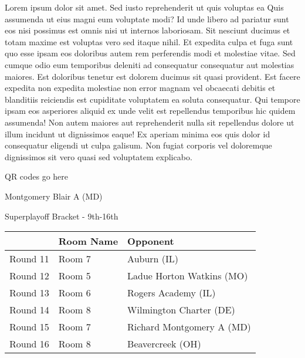 \documentclass{article}%
\begin{document}
\vspace*{8pt}%
\linebreak%
\newline%
\newline%
    Lorem ipsum dolor sit amet. Sed iusto reprehenderit ut quis voluptas ea Quis assumenda ut eius magni eum voluptate modi? Id unde libero ad pariatur sunt eos nisi possimus est omnis nisi ut internos laboriosam. Sit nesciunt ducimus et totam maxime est voluptas vero sed itaque nihil. Et expedita culpa et fuga sunt quo esse ipsam eos doloribus autem rem perferendis modi et molestiae vitae.\newline%
\newline%
    Sed cumque odio eum temporibus deleniti ad consequatur consequatur aut molestias maiores. Est doloribus tenetur est dolorem ducimus sit quasi provident. Est facere expedita non expedita molestiae non error magnam vel obcaecati debitis et blanditiis reiciendis est cupiditate voluptatem ea soluta consequatur. Qui tempore ipsam eos asperiores aliquid ex unde velit est repellendus temporibus hic quidem assumenda!\newline%
\newline%
    Non autem maiores aut reprehenderit nulla sit repellendus dolore ut illum incidunt ut dignissimos eaque! Ex aperiam minima eos quis dolor id consequatur eligendi ut culpa galisum. Non fugiat corporis vel doloremque dignissimos sit vero quasi sed voluptatem explicabo.\newline%
\newline%
\vspace*{30pt}%
\begin{center}%
\begin{Huge}%
QR codes go here%
\end{Huge}%
\end{center}%
\newpage%
\begin{center}%
\begin{Huge}%
Montgomery Blair A (MD)%
\end{Huge}%
\vspace*{8pt}%
\linebreak%
\begin{Large}%
Superplayoff Bracket {-} 9th{-}16th%
\end{Large}%
\end{center}%
%
\begin{tabularx}{\textwidth}{|c|Y|Y|}%
\hline%
&Room Name&Opponent\\%
\hline%
Round 11&Room 7&Auburn (IL)\\%
Round 12&Room 5&Ladue Horton Watkins (MO)\\%
Round 13&Room 6&Rogers Academy (IL)\\%
Round 14&Room 8&Wilmington Charter (DE)\\%
Round 15&Room 7&Richard Montgomery A (MD)\\%
Round 16&Room 8&Beavercreek (OH)\\%
\hline%
\end{tabularx}%
\end{document}
